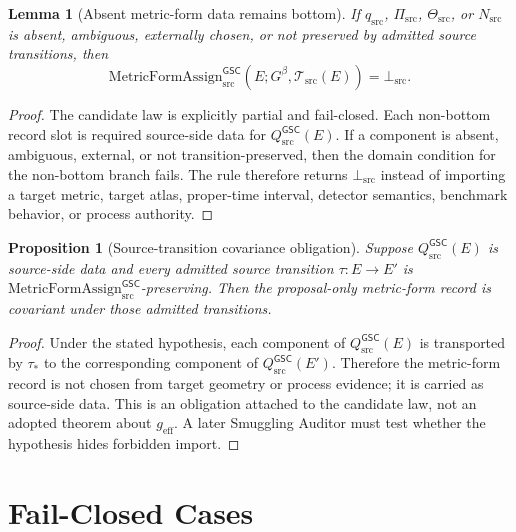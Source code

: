 \documentclass[11pt]{article}
\newcommand{\Gbeta}{G^{\beta}}
\newcommand{\geff}{g_{\mathrm{eff}}}
\newcommand{\MetricFormAssign}{\mathrm{MetricFormAssign}_{\mathrm{src}}^{\mathsf{GSC}}}
\newcommand{\Qsrc}{Q_{\mathrm{src}}^{\mathsf{GSC}}}
\newcommand{\FormTok}{q_{\mathrm{src}}}
\newcommand{\PairTok}{\Pi_{\mathrm{src}}}
\newcommand{\TransportTok}{\Theta_{\mathrm{src}}}
\newcommand{\NondegTok}{N_{\mathrm{src}}}
\newcommand{\BottomSrc}{\bot_{\mathrm{src}}}
\newtheorem{lemma}{Lemma}
\newtheorem{proposition}{Proposition}
\begin{document}
\begin{lemma}[Absent metric-form data remains bottom]
If \(\FormTok\), \(\PairTok\), \(\TransportTok\), or \(\NondegTok\) is absent,
ambiguous, externally chosen, or not preserved by admitted source transitions,
then
\[
  \MetricFormAssign(E;\Gbeta,\mathcal T_{\mathrm{src}}(E))=\BottomSrc .
\]
\end{lemma}

\begin{proof}
The candidate law is explicitly partial and fail-closed. Each non-bottom
record slot is required source-side data for \(\Qsrc(E)\). If a component is
absent, ambiguous, external, or not transition-preserved, then the domain
condition for the non-bottom branch fails. The rule therefore returns
\(\BottomSrc\) instead of importing a target metric, target atlas, proper-time
interval, detector semantics, benchmark behavior, or process authority.
\end{proof}

\begin{proposition}[Source-transition covariance obligation]
Suppose \(\Qsrc(E)\) is source-side data and every admitted source transition
\(\tau:E\to E'\) is \(\MetricFormAssign\)-preserving. Then the proposal-only
metric-form record is covariant under those admitted transitions.
\end{proposition}

\begin{proof}
Under the stated hypothesis, each component of \(\Qsrc(E)\) is transported by
\(\tau_{\ast}\) to the corresponding component of \(\Qsrc(E')\). Therefore the
metric-form record is not chosen from target geometry or process evidence; it
is carried as source-side data. This is an obligation attached to the
candidate law, not an adopted theorem about \(\geff\). A later Smuggling
Auditor must test whether the hypothesis hides forbidden import.
\end{proof}

\section{Fail-Closed Cases}
\end{document}
